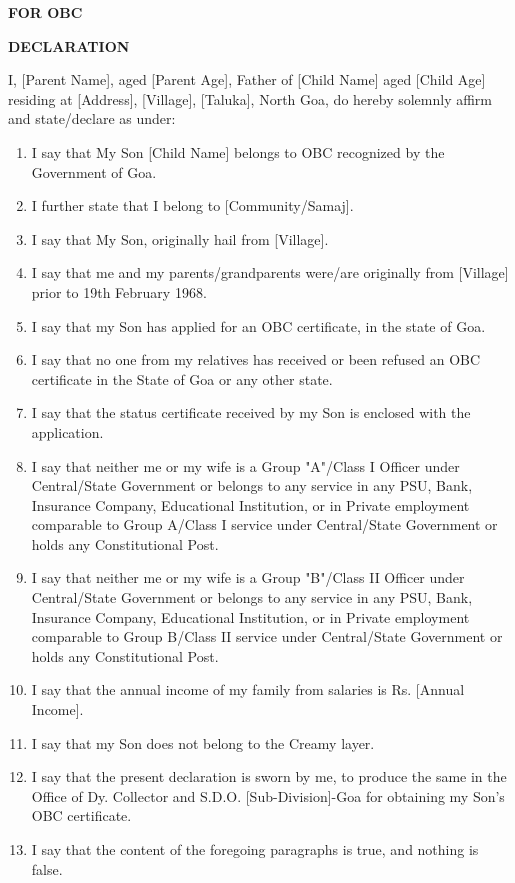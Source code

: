 \documentclass[12pt, a4paper]{article}
\begin{document}
\begin{center}
    \textbf{\Large FOR OBC}
\end{center}

\begin{flushleft}
\end{flushleft}

\begin{center}
    \textbf{\Large DECLARATION}
\end{center}

I, [Parent Name], aged [Parent Age], Father of [Child Name] aged [Child Age] residing at [Address], [Village], [Taluka], North Goa, do hereby solemnly affirm and state/declare as under:

\begin{enumerate}
    \item I say that My Son [Child Name] belongs to OBC recognized by the Government of Goa.
    \item I further state that I belong to [Community/Samaj].
    \item I say that My Son, originally hail from [Village].
    \item I say that me and my parents/grandparents were/are originally from [Village] prior to 19th February 1968.
    \item I say that my Son has applied for an OBC certificate, in the state of Goa.
    \item I say that no one from my relatives has received or been refused an OBC certificate in the State of Goa or any other state.
    \item I say that the status certificate received by my Son is enclosed with the application.
    \item I say that neither me or my wife is a Group "A"/Class I Officer under Central/State Government or belongs to any service in any PSU, Bank, Insurance Company, Educational Institution, or in Private employment comparable to Group A/Class I service under Central/State Government or holds any Constitutional Post.
    \item I say that neither me or my wife is a Group "B"/Class II Officer under Central/State Government or belongs to any service in any PSU, Bank, Insurance Company, Educational Institution, or in Private employment comparable to Group B/Class II service under Central/State Government or holds any Constitutional Post.
    \item I say that the annual income of my family from salaries is Rs. [Annual Income].
    \item I say that my Son does not belong to the Creamy layer.
    \item I say that the present declaration is sworn by me, to produce the same in the Office of Dy. Collector and S.D.O. [Sub-Division]-Goa for obtaining my Son's OBC certificate.
    \item I say that the content of the foregoing paragraphs is true, and nothing is false.
\end{enumerate}
\end{document}
